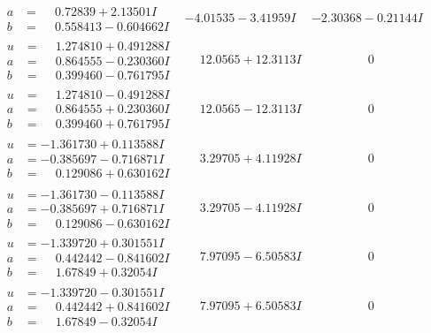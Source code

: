 \documentclass[1p]{elsarticle_modified}
\theoremstyle{definition}
\begin{document}
$$\begin{array}{c|c|c}
\begin{aligned}
a &= \phantom{-}0.72839 + 2.13501 I \\
b &= \phantom{-}0.558413 - 0.604662 I\end{aligned}
 & -4.01535 - 3.41959 I & -2.30368 - 0.21144 I \\ \hline\begin{aligned}
u &= \phantom{-}1.274810 + 0.491288 I \\
a &= \phantom{-}0.864555 - 0.230360 I \\
b &= \phantom{-}0.399460 - 0.761795 I\end{aligned}
 & \phantom{-}12.0565 + 12.3113 I & \phantom{-0.000000 } 0 \\ \hline\begin{aligned}
u &= \phantom{-}1.274810 - 0.491288 I \\
a &= \phantom{-}0.864555 + 0.230360 I \\
b &= \phantom{-}0.399460 + 0.761795 I\end{aligned}
 & \phantom{-}12.0565 - 12.3113 I & \phantom{-0.000000 } 0 \\ \hline\begin{aligned}
u &= -1.361730 + 0.113588 I \\
a &= -0.385697 - 0.716871 I \\
b &= \phantom{-}0.129086 + 0.630162 I\end{aligned}
 & \phantom{-}3.29705 + 4.11928 I & \phantom{-0.000000 } 0 \\ \hline\begin{aligned}
u &= -1.361730 - 0.113588 I \\
a &= -0.385697 + 0.716871 I \\
b &= \phantom{-}0.129086 - 0.630162 I\end{aligned}
 & \phantom{-}3.29705 - 4.11928 I & \phantom{-0.000000 } 0 \\ \hline\begin{aligned}
u &= -1.339720 + 0.301551 I \\
a &= \phantom{-}0.442442 - 0.841602 I \\
b &= \phantom{-}1.67849 + 0.32054 I\end{aligned}
 & \phantom{-}7.97095 - 6.50583 I & \phantom{-0.000000 } 0 \\ \hline\begin{aligned}
u &= -1.339720 - 0.301551 I \\
a &= \phantom{-}0.442442 + 0.841602 I \\
b &= \phantom{-}1.67849 - 0.32054 I\end{aligned}
 & \phantom{-}7.97095 + 6.50583 I & \phantom{-0.000000 } 0\\

\end{array}$$
\end{document}
